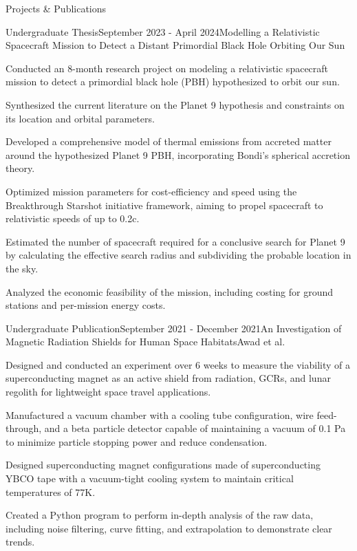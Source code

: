 \documentclass{resume} %
\begin{document}

\begin{rSection}{Projects \& Publications}

\begin{rSubsection}{Undergraduate Thesis}{September 2023 - April 2024}{Modelling a Relativistic Spacecraft Mission to Detect a Distant Primordial Black Hole Orbiting Our Sun}{}
\item Conducted an 8-month research project on modeling a relativistic spacecraft mission to detect a primordial black hole (PBH) hypothesized to orbit our sun.
\item Synthesized the current literature on the Planet 9 hypothesis and constraints on its location and orbital parameters.
\item Developed a comprehensive model of thermal emissions from accreted matter around the hypothesized Planet 9 PBH, incorporating Bondi's spherical accretion theory.
\item Optimized mission parameters for cost-efficiency and speed using the Breakthrough Starshot initiative framework, aiming to propel spacecraft to relativistic speeds of up to 0.2c.
\item Estimated the number of spacecraft required for a conclusive search for Planet 9 by calculating the effective search radius and subdividing the probable location in the sky.
\item Analyzed the economic feasibility of the mission, including costing for ground stations and per-mission energy costs.
\end{rSubsection}

\begin{rSubsection}{Undergraduate Publication}{September 2021 - December 2021}{An Investigation of Magnetic Radiation Shields for Human Space Habitats}{Awad et al.}
\item Designed and conducted an experiment over 6 weeks to measure the viability of a superconducting magnet as an active shield from radiation, GCRs, and lunar regolith for lightweight space travel applications.
\item Manufactured a vacuum chamber with a cooling tube configuration, wire feed-through, and a beta particle detector capable of maintaining a vacuum of 0.1 Pa to minimize particle stopping power and reduce condensation.
\item Designed superconducting magnet configurations made of superconducting YBCO tape with a vacuum-tight cooling system to maintain critical temperatures of 77K.
\item Created a Python program to perform in-depth analysis of the raw data, including noise filtering, curve fitting, and extrapolation to demonstrate clear trends.
\end{rSubsection}



\end{rSection}
\end{document}
